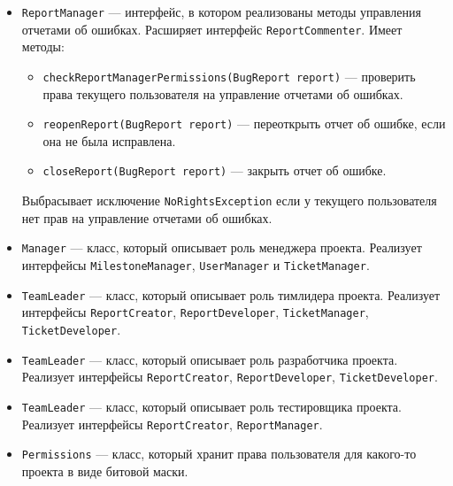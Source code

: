\begin{itemize}
		\item \texttt{ReportManager} --- интерфейс, в котором реализованы методы управления отчетами об ошибках. Расширяет интерфейс \texttt{ReportCommenter}. Имеет методы:
		\begin{itemize}
			\item \texttt{checkReportManagerPermissions(BugReport report)} --- проверить права текущего пользователя на  управление отчетами об ошибках.
			\item \texttt{reopenReport(BugReport report)} --- переоткрыть отчет об ошибке, если она не была исправлена.
			\item \texttt{closeReport(BugReport report)} --- закрыть отчет об ошибке.
		\end{itemize}
		
		Выбрасывает исключение \texttt{NoRightsException} если у текущего пользователя нет прав на управление отчетами об ошибках.
		
		\item \texttt{Manager} --- класс, который описывает роль менеджера проекта. Реализует интерфейсы \texttt{MilestoneManager}, \texttt{UserManager} и \texttt{TicketManager}.
		
		\item \texttt{TeamLeader} --- класс, который описывает роль тимлидера проекта. Реализует интерфейсы \texttt{ReportCreator}, \texttt{ReportDeveloper}, \texttt{TicketManager}, \texttt{TicketDeveloper}.
		
		\item \texttt{TeamLeader} --- класс, который описывает роль разработчика проекта. Реализует интерфейсы \texttt{ReportCreator}, \texttt{ReportDeveloper}, \texttt{TicketDeveloper}.
		
		\item \texttt{TeamLeader} --- класс, который описывает роль тестировщика проекта. Реализует интерфейсы \texttt{ReportCreator}, \texttt{ReportManager}.
		
		\item \texttt{Permissions} --- класс, который хранит права пользователя для какого-то проекта в виде битовой маски.
	\end{itemize}